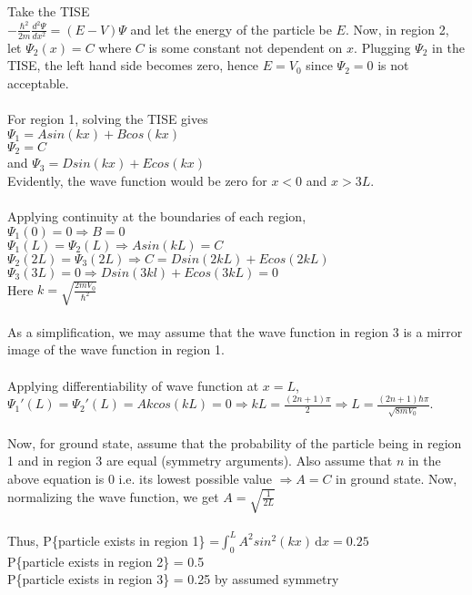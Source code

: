 \documentclass{article}
\begin{document}
Take the TISE\\\(-\frac{\hbar^2}{2m}\frac{d^2\Psi}{dx^2} = (E-V)\Psi\) and let the energy of the particle be \(E\). Now, in region 2, let \(\Psi_2(x) = C\) where \(C\) is some constant not dependent on \(x\). Plugging \(\Psi_2\) in the TISE, the left hand side becomes zero, hence \(E=V_0\) since \(\Psi_2 = 0\) is not acceptable.\\\\For region 1, solving the TISE gives\\ \(\Psi_1 = Asin(kx) + Bcos(kx)\)\\\(\Psi_2 = C\)\\and \(\Psi_3 = Dsin(kx) + Ecos(kx)\)\\Evidently, the wave function would be zero for \(x<0\) and \(x > 3L\).\\\\Applying continuity at the boundaries of each region,\\\(\Psi_1(0)=0 \Rightarrow B=0\)\\\(\Psi_1(L)=\Psi_2(L) \Rightarrow Asin(kL)=C\)\\\(\Psi_2(2L) = \Psi_3(2L) \Rightarrow C = Dsin(2kL) + Ecos(2kL)\)\\\(\Psi_3(3L)=0 \Rightarrow Dsin(3kl) + Ecos(3kL) = 0\)\\Here \(k = \sqrt{\frac{2mV_0}{\hbar^2}}\)\\\\As a simplification, we may assume that the wave function in region 3 is a mirror image of the wave function in region 1.\\\\Applying differentiability of wave function at \(x=L\), \(\Psi_1'(L) = \Psi_2'(L) = Akcos(kL)=0 \Rightarrow kL = \frac{(2n+1)\pi}{2} \Rightarrow L = \frac{(2n+1)\hbar\pi}{\sqrt{8mV_0}}\).\\\\Now, for ground state, assume that the probability of the particle being in region 1 and in region 3 are equal (symmetry arguments). Also assume that \(n\) in the above equation is 0 i.e. its lowest possible value \(\Rightarrow A = C\) in ground state. Now, normalizing the wave function, we get \(A = \sqrt{\frac{1}{2L}}\)\\\\Thus, P\{particle exists in region 1\} =\(\int_0^L A^2sin^2(kx)\,\mathrm{d}x = 0.25\)\\P\{particle exists in region 2\} = 0.5\\P\{particle exists in region 3\} = 0.25 by assumed symmetry\\
\end{document}
